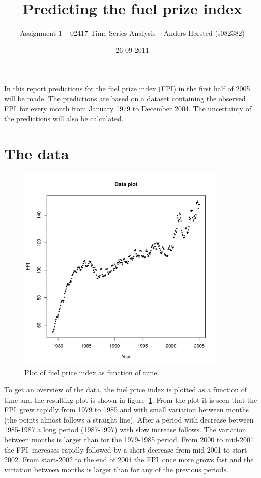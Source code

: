 \documentclass[11pt]{article}
\title{Predicting the fuel prize index}
\date{26-09-2011}
\author{Assignment 1 -- 02417 Time Series Analysis -- Anders Hørsted (s082382)}
\date{} %
\newcommand\fpi{FPI}
\begin{document}
\maketitle

In this report predictions for the fuel prize index (\fpi) in the first half of 2005 will be made. The predictions are based on a dataset containing the observed \fpi\ for every month from January 1979 to December 2004. The uncertainty of the predictions will also be calculated. \\ 

\section*{The data}

\begin{figure}
    \centering
    \includegraphics[width=100mm]{data-plot.pdf}
    \caption{Plot of fuel price index as function of time}
    \label{fig:plot-question-1}
\end{figure}

To get an overview of the data, the fuel price index is plotted as a function of time and the resulting plot is shown in figure~\ref{fig:plot-question-1}. From the plot it is seen that the \fpi\ grew rapidly from 1979 to 1985 and with small variation between months (the points almost follows a straight line). After a period with decrease between 1985-1987 a long period (1987-1997) with slow increase follows. The variation between months is larger than for the 1979-1985 period. From 2000 to mid-2001 the \fpi\ increases rapidly followed by a short decrease from mid-2001 to start-2002. From start-2002 to the end of 2004 the \fpi\ once more grows fast and the variation between months is larger than for any of the previous periods. \\
\end{document}
